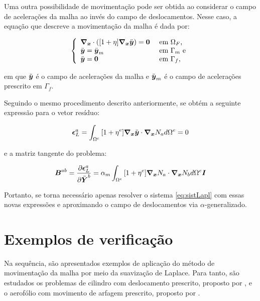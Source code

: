Uma outra possibilidade de movimentação pode ser obtida ao considerar o campo de acelerações da malha ao invés do campo de deslocamentos. Nesse caso, a equação que descreve a movimentação da malha é dada por:

\begin{equation}
    \left\{
    \begin{array}{ll}
        \boldsymbol{\nabla_x}\cdot([1+\eta]\boldsymbol{\nabla_x}\ddot{\boldsymbol{y}})=\boldsymbol{0} & \text{ em }\Omega_F\text{,}  \\
        \ddot{\boldsymbol{y}}=\ddot{\boldsymbol{y}}_m                  & \text{ em }\Gamma_m\text{ e} \\
        \ddot{\boldsymbol{y}}=\boldsymbol{0}                      & \text{ em }\Gamma_f\text{,}
    \end{array}
    \right.
    \label{eq:LaplMovAcc}
\end{equation}

\noindent em que $\ddot{\boldsymbol{y}}$ é o campo de acelerações da malha e $\ddot{\boldsymbol{y}}_m$ é o campo de acelerações prescrito em $\Gamma_f$.

Seguindo o mesmo procedimento descrito anteriormente, se obtém a seguinte expressão para o vetor resíduo:

\begin{equation}
    \boldsymbol{\epsilon}_L^a=\int_{\Omega^e}{[1+\eta^e]\boldsymbol{\nabla_x}\ddot{\boldsymbol{y}}\cdot\boldsymbol{\nabla_x} N_a d\Omega^e}=0
    \label{eq:resLaplAcc}
\end{equation}

\noindent e a matriz tangente do problema:

\begin{equation}
    \boldsymbol{B}^{ab}=\frac{\partial{\boldsymbol{\epsilon}_L^a}}{\partial{\ddot{\boldsymbol{Y}}^b}}=\alpha_m\int_{\Omega^e}{[1+\eta^e]\boldsymbol{\nabla_x} N_a\cdot\boldsymbol{\nabla_x} N_b d\Omega^e}\boldsymbol{I}
    \label{eq:movMatrizAcc}
\end{equation}

Portanto, se torna necessário apenas resolver o sistema \ref{eq:sistLapl} com essas novas expressões e aproximando o campo de deslocamentos via $\alpha$-generalizado.

\section{Exemplos de verificação}

Na sequência, são apresentados exemplos de aplicação do método de movimentação da malha por meio da suavização de Laplace. Para tanto, são estudados os problemas de cilindro com deslocamento prescrito, proposto por , e o aerofólio com movimento de arfagem prescrito, proposto por .

